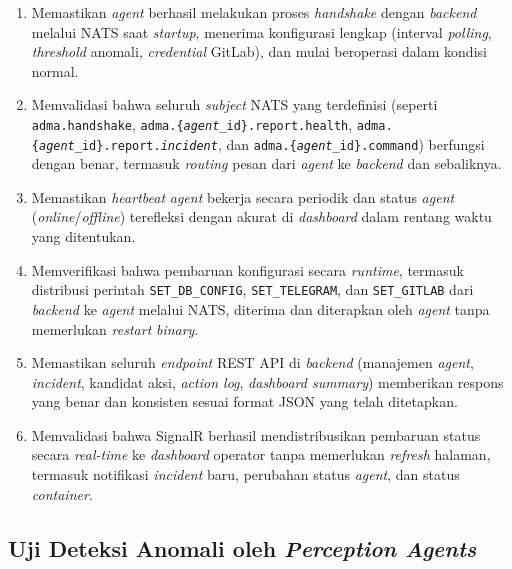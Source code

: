 \begin{enumerate}[label=\arabic*., leftmargin=*]
  \item Memastikan \textit{agent} berhasil melakukan proses \textit{handshake} dengan \textit{backend} melalui NATS saat \textit{startup}, menerima konfigurasi lengkap (interval \textit{polling}, \textit{threshold} anomali, \textit{credential} GitLab), dan mulai beroperasi dalam kondisi normal.
  \item Memvalidasi bahwa seluruh \textit{subject} NATS yang terdefinisi (seperti \texttt{adma.\allowbreak handshake}, \texttt{adma.\allowbreak \{\allowbreak \textit{agent}\allowbreak \_id\}\allowbreak .report\allowbreak .health}, \texttt{adma.\allowbreak \{\allowbreak \textit{agent}\allowbreak \_id\}\allowbreak .report\allowbreak .\textit{incident}}, dan \texttt{adma.\allowbreak \{\allowbreak \textit{agent}\allowbreak \_id\}\allowbreak .command}) berfungsi dengan benar, termasuk \textit{routing} pesan dari \textit{agent} ke \textit{backend} dan sebaliknya.
  \item Memastikan \textit{heartbeat} \textit{agent} bekerja secara periodik dan status \textit{agent} (\textit{online}/\textit{offline}) terefleksi dengan akurat di \textit{dashboard} dalam rentang waktu yang ditentukan.
  \item Memverifikasi bahwa pembaruan konfigurasi secara \textit{runtime}, termasuk distribusi perintah \texttt{SET\_DB\_CONFIG}, \texttt{SET\_TELEGRAM}, dan \texttt{SET\_GITLAB} dari \textit{backend} ke \textit{agent} melalui NATS, diterima dan diterapkan oleh \textit{agent} tanpa memerlukan \textit{restart} \textit{binary}.
  \item Memastikan seluruh \textit{endpoint} REST API di \textit{backend} (manajemen \textit{agent}, \textit{incident}, kandidat aksi, \textit{action log}, \textit{dashboard summary}) memberikan respons yang benar dan konsisten sesuai format JSON yang telah ditetapkan.
  \item Memvalidasi bahwa SignalR berhasil mendistribusikan pembaruan status secara \textit{real-time} ke \textit{dashboard} operator tanpa memerlukan \textit{refresh} halaman, termasuk notifikasi \textit{incident} baru, perubahan status \textit{agent}, dan status \textit{container}.
\end{enumerate}

\subsection{Uji Deteksi Anomali oleh \textit{Perception Agents}}

